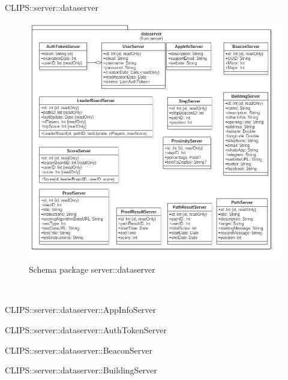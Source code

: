\begin{componente}{CLIPS::server::dataserver}
\begin{figure}[h!] 
\centering 
\includegraphics[scale=0.4]{img/package/png/server--data.png} 
\caption{Schema package server::dataserver} 
 \end{figure} 
\begin{compClassi} \\ 
\begin{classe}{CLIPS::server::dataserver::AppInfoServer}
\end{classe}\begin{classe}{CLIPS::server::dataserver::AuthTokenServer}
\end{classe}\begin{classe}{CLIPS::server::dataserver::BeaconServer}
\end{classe}\begin{classe}{CLIPS::server::dataserver::BuildingServer}

\end{classe}
\end{compClassi}
\end{componente}
